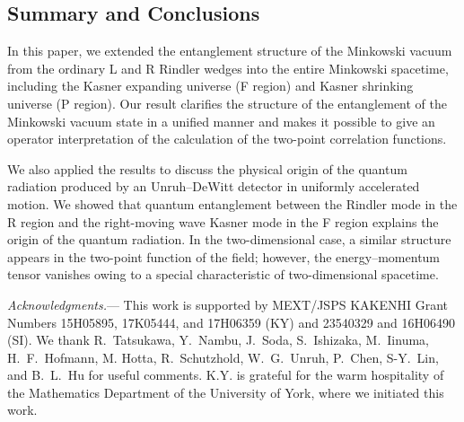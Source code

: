 \documentclass[aps,prd,preprintnumbers,nofootinbib,showpacs,11pt]{revtex4}%
\begin{document}
\begin{widetext}
\section{Summary and Conclusions}
In this paper, we extended the entanglement structure of the Minkowski vacuum 
from the ordinary L and R Rindler wedges into the entire 
Minkowski spacetime, including 
the Kasner expanding universe (F region) and Kasner shrinking universe (P region). 
Our result clarifies the structure of the entanglement of the Minkowski vacuum state in a unified manner and 
makes it possible to give an operator interpretation of the calculation of
the two-point correlation functions.

We also applied the results to discuss the physical origin of 
 the quantum radiation produced by an Unruh--DeWitt detector
in uniformly accelerated motion. 
We showed that quantum entanglement between the Rindler mode 
in the R region and the right-moving wave Kasner mode in the F region explains the origin of 
 the quantum radiation. 
In the two-dimensional case, a similar structure appears in the two-point function
of the field; however, the energy--momentum tensor vanishes owing to a special characteristic
of two-dimensional spacetime.


\vspace{2mm}
{\it Acknowledgments.}---
This work is supported by MEXT/JSPS KAKENHI Grant Numbers 15H05895, 
17K05444, and 17H06359 (KY) and 23540329 and 16H06490 (SI). 
We thank R.~Tatsukawa, Y.~Nambu, J.~Soda, S.~Ishizaka, M.~Iinuma, H.~F.~Hofmann,
M. Hotta, R.~Schutzhold, W.~G.~Unruh, P.~Chen, S-Y.~Lin, and B.~L.~Hu for useful comments.
K.Y. is grateful for the warm hospitality of the Mathematics Department 
of the University of York, where we initiated this work. 


\appendix


\end{widetext}
\end{document}
